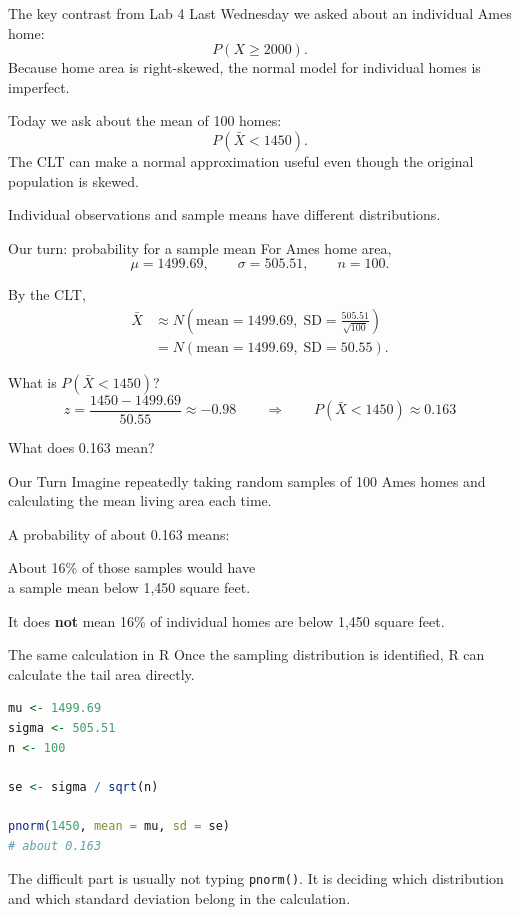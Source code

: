 \documentclass[11pt,aspectratio=169]{beamer}
\newcommand{\ourturn}[1]{%
\begin{center}
\begin{minipage}{0.90\textwidth}
\begin{block}{Our Turn}
#1
\end{block}
\end{minipage}
\end{center}}
\begin{document}
\begin{frame}{The key contrast from Lab 4}
Last Wednesday we asked about an \alert{individual} Ames home:
\[
P(X\ge 2000).
\]
Because home area is right-skewed, the normal model for individual homes is imperfect.

\vspace{0.8em}
Today we ask about the \alert{mean of 100 homes}:
\[
P(\bar{X}<1450).
\]
The CLT can make a normal approximation useful even though the original population is skewed.

\vfill
\alert{Individual observations and sample means have different distributions.}
\end{frame}

\begin{frame}{Our turn: probability for a sample mean}
For Ames home area,
\[
\mu=1499.69,\qquad \sigma=505.51,\qquad n=100.
\]

By the CLT,
\[
\begin{aligned}
\bar{X}&\approx N\!\left(\text{mean}=1499.69,\;\text{SD}=\frac{505.51}{\sqrt{100}}\right)\\
&=N(\text{mean}=1499.69,\;\text{SD}=50.55).
\end{aligned}
\]

What is $P(\bar{X}<1450)$?
\[
z=\frac{1450-1499.69}{50.55}\approx-0.98
\qquad\Longrightarrow\qquad
\boxed{P(\bar{X}<1450)\approx0.163}
\]
\end{frame}

\begin{frame}{What does 0.163 mean?}
\ourturn{Imagine repeatedly taking random samples of 100 Ames homes and calculating the mean living area each time.}

\vspace{0.8em}
A probability of about 0.163 means:

\begin{center}
\Large About \alert{16\%} of those samples would have\\
a sample mean below 1,450 square feet.
\end{center}

\vfill
It does \textbf{not} mean 16\% of individual homes are below 1,450 square feet.
\end{frame}

\begin{frame}[fragile]{The same calculation in R}
Once the sampling distribution is identified, R can calculate the tail area directly.

\begin{lstlisting}[language=R]
mu <- 1499.69
sigma <- 505.51
n <- 100

se <- sigma / sqrt(n)

pnorm(1450, mean = mu, sd = se)
# about 0.163
\end{lstlisting}

\vfill
The difficult part is usually not typing \texttt{pnorm()}. It is deciding \alert{which distribution} and \alert{which standard deviation} belong in the calculation.
\end{frame}
\end{document}
